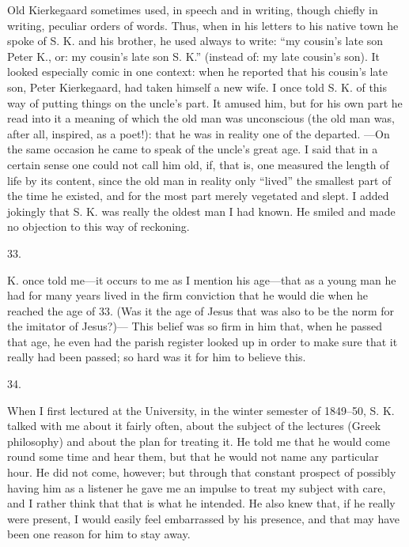 \documentclass[12pt,a4paper,openany]{book}
\newcommand{\secnum}[1]{\par\begin{center}#1\end{center}\par\nobreak}
\newcommand{\opage}[1]{\marginnote{\footnotesize\textit{[#1]}}}
\begin{document}
Old Kierkegaard sometimes used, in speech and in
writing, though chiefly in writing, peculiar orders of words. Thus,
when in his letters to his native town he
spoke of S. K. and his brother, he used always to write: ``my
cousin's late son Peter K., or: my cousin's late
son S. K.'' (instead of: my late cousin's son). It
looked especially comic in one context: when he reported
that his cousin's late son, Peter Kierkegaard,
had taken himself a new wife. I once told S. K.
of this way of putting things on the uncle's part. It amused him,
but for his own part he read into it a meaning of which the
old man was unconscious (the old man was, after all, inspired, as a
poet!): that he was in reality one of the departed.
---On the same occasion he came to speak of
the uncle's great age. I said that in a certain sense
one could not call him old, if, that is, one
measured the length of life by its content, since the old man
in reality only ``lived'' the smallest part of the
\opage{361}time he existed, and for the most part merely vegetated and slept.
I added jokingly that S. K. was really the oldest
man I had known. He smiled and made no
objection to this way of reckoning.

\secnum{33.}

K. once told me---it occurs to me as I
mention his age---that as a young man he had for many years
lived in the firm conviction that he would
die when he reached the age of 33. (Was it the age of Jesus
that was also to be the norm for the imitator of Jesus?)---
This belief was so firm in him that, when he passed
that age, he even had the parish register looked up in order
to make sure that it really had been passed; so
hard was it for him to believe this.

\secnum{34.}

When I first lectured at the University,
in the winter semester of 1849--50, S. K. talked with me about it
fairly often, about the subject of the lectures (Greek
philosophy) and about the plan for treating it. He
told me that he would come round some time and hear
them, but that he would not name any particular hour.
He did not come, however; but through that constant prospect
of possibly having him as a listener he gave me an impulse
to treat my subject with care, and
I rather think that that is what he intended. He also
knew that, if he really were present, I
would easily feel embarrassed by his presence, and that may
have been one reason for him to stay away.
\end{document}

